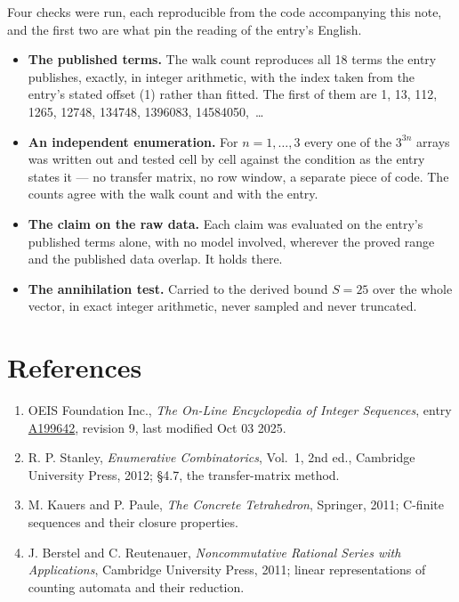 \documentclass[11pt]{article}
\theoremstyle{definition}
\begin{document}
Four checks were run, each reproducible from the code accompanying this note, and the first two are what pin the reading of the entry's English.

\begin{itemize}

\item {\bfseries The published terms.} The walk count reproduces all 18 terms the entry publishes, exactly, in integer arithmetic, with the index taken from the entry's stated offset (1) rather than fitted. The first of them are 1, 13, 112, 1265, 12748, 134748, 1396083, 14584050,~\dots

\item {\bfseries An independent enumeration.} For $n = 1,\dots,3$ every one of the $3^{3n}$ arrays was written out and tested cell by cell against the condition as the entry states it --- no transfer matrix, no row window, a separate piece of code. The counts agree with the walk count and with the entry.

\item {\bfseries The claim on the raw data.} Each claim was evaluated on the entry's published terms alone, with no model involved, wherever the proved range and the published data overlap. It holds there.

\item {\bfseries The annihilation test.} Carried to the derived bound $S = 25$ over the whole vector, in exact integer arithmetic, never sampled and never truncated.

\end{itemize}

\section{References}

\begin{enumerate}

\item OEIS Foundation Inc., \emph{The On-Line Encyclopedia of Integer Sequences}, entry \href{https://oeis.org/A199642}{A199642}, revision 9, last modified Oct 03 2025.

\item R. P. Stanley, \emph{Enumerative Combinatorics}, Vol.~1, 2nd ed., Cambridge University Press, 2012; \S4.7, the transfer-matrix method.

\item M. Kauers and P. Paule, \emph{The Concrete Tetrahedron}, Springer, 2011; C-finite sequences and their closure properties.

\item J. Berstel and C. Reutenauer, \emph{Noncommutative Rational Series with Applications}, Cambridge University Press, 2011; linear representations of counting automata and their reduction.

\end{enumerate}
\end{document}
